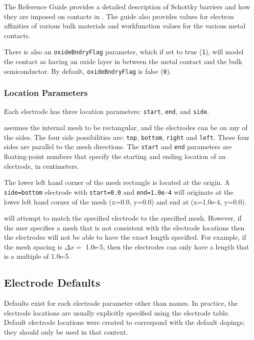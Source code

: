 The \Xyce{} Reference Guide\ReferenceGuide{}
provides a detailed description of Schottky barriers and how they are imposed on contacts in \Xyce{}.
The guide also provides values for electron affinities of various bulk materials and 
workfunction values for the various metal contacts.


There is also an \texttt{oxideBndryFlag} parameter, which if set to true
(\texttt{1}), will model the contact as having an oxide layer in between
the metal contact and the bulk semiconductor.  By default,
\texttt{oxideBndryFlag} is false (\texttt{0}).  

\subsubsection{Location Parameters}
Each electrode has three location parameters: \texttt{start}, 
\texttt{end}, and \texttt{side}.  

\Xyce{} assumes the internal mesh to be rectangular, 
and the electrodes can be on any of the sides.  The four side possibilities
are: \texttt{top}, \texttt{bottom}, \texttt{right} and \texttt{left}.
These four sides are parallel to the mesh directions.  The \texttt{start} and
\texttt{end} parameters are floating-point numbers that specify the
starting and ending location of an electrode, in centimeters.

The lower left hand corner of the mesh rectangle is located 
at the origin.  A \texttt{side=bottom} electrode with \texttt{start=0.0} 
and \texttt{end=1.0e-4} will originate at the lower left hand 
corner of the mesh (x=0.0, y=0.0) and end at (x=1.0e-4, y=0.0).

\Xyce{} will attempt to match the specified electrode to
the specified mesh.  However, if the user specifies a mesh that is not
consistent with the electrode locations then the electrodes will not be 
able to have the exact length specified.  For example, if the mesh spacing
is $\Delta x = $ 1.0e-5, then the electrodes can only have a length
that is a multiple of 1.0e-5.

\subsection{Electrode Defaults}
Defaults exist for each electrode parameter other than names.
In practice, the electrode locations  are usually explicitly
specified  using the electrode table.
Default electrode locations were created to correspond with 
the default dopings; they should only be used in that context.

